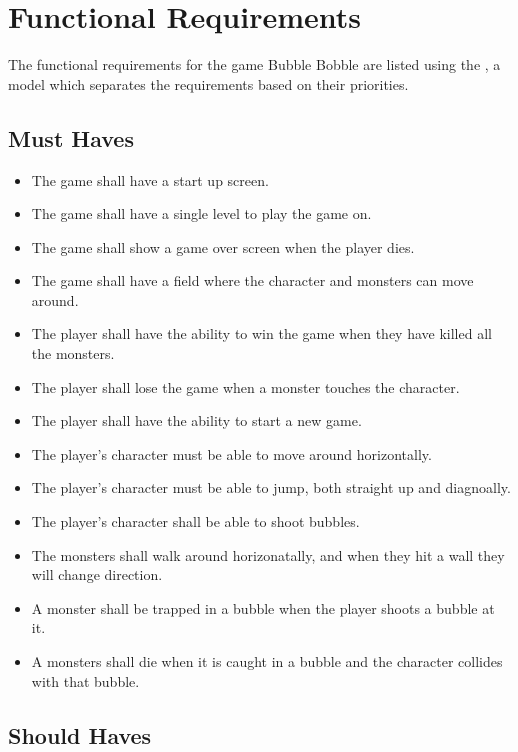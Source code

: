 \chapter{Functional Requirements}

The functional requirements for the game Bubble Bobble are listed using the , a model which separates the requirements based on their priorities.

\section{Must Haves}

\begin{itemize}
\itemsep0em 
 	\item The game shall have a start up screen.
  	\item The game shall have a single level to play the game on.
  	\item The game shall show a game over screen when the player dies.
 	\item The game shall have a field where the character and monsters can move around.
  	\item The player shall have the ability to win the game when they have killed all the monsters.
 	\item The player shall lose the game when a monster touches the character.
 	\item The player shall have the ability to start a new game.	
  	\item The player's character must be able to move around horizontally.
  	\item The player's character must be able to jump, both straight up and diagnoally.
  	\item The player's character shall be able to shoot bubbles.
  	\item The monsters shall walk around horizonatally, and when they hit a wall they will change direction. 
 	\item A monster shall be trapped in a bubble when the player shoots a bubble at it.
 	\item A monsters shall die when it is caught in a bubble and the character collides with that bubble.
\end{itemize}

\section{Should Haves}

